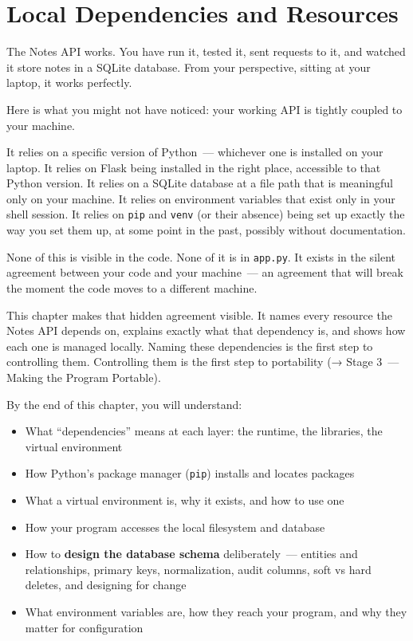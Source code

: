 \setcounter{chapter}{5}
\chapter{Local Dependencies and Resources}\label{ch:06-local-dependencies}

\chapterrule

The Notes API works. You have run it, tested it, sent requests to it, and watched it store notes in a SQLite database. From your perspective, sitting at your laptop, it works perfectly.

Here is what you might not have noticed: your working API is tightly coupled to your machine.

It relies on a specific version of Python~--- whichever one is installed on your laptop. It relies on Flask being installed in the right place, accessible to that Python version. It relies on a SQLite database at a file path that is meaningful only on your machine. It relies on environment variables that exist only in your shell session. It relies on \texttt{pip} and \texttt{venv} (or their absence) being set up exactly the way you set them up, at some point in the past, possibly without documentation.

None of this is visible in the code. None of it is in \texttt{app.py}. It exists in the silent agreement between your code and your machine~--- an agreement that will break the moment the code moves to a different machine.

This chapter makes that hidden agreement visible. It names every resource the Notes API depends on, explains exactly what that dependency is, and shows how each one is managed locally. Naming these dependencies is the first step to controlling them. Controlling them is the first step to portability (→ Stage 3~--- Making the Program Portable).

\begin{objectives}

By the end of this chapter, you will understand:

\begin{itemize}
\tightlist
\item
  What ``dependencies'' means at each layer: the runtime, the libraries, the virtual environment
\item
  How Python's package manager (\texttt{pip}) installs and locates packages
\item
  What a virtual environment is, why it exists, and how to use one
\item
  How your program accesses the local filesystem and database
\item
  How to \textbf{design the database schema} deliberately~--- entities and relationships, primary keys, normalization, audit columns, soft vs hard deletes, and designing for change
\item
  What environment variables are, how they reach your program, and why they matter for configuration
\end{itemize}

\end{objectives}

